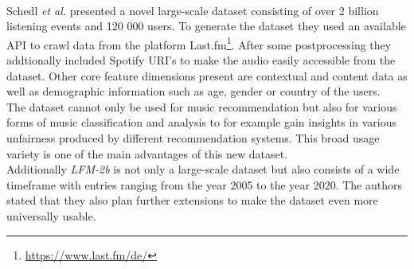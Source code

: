 \documentclass[runningheads,a4paper]{llncs}
\begin{document}
\\
Schedl \textit{et al.} presented a novel large-scale dataset consisting of over 2 billion listening events and 120 000 users.
To generate the dataset they used an available API to crawl data from the platform Last.fm\footnote{\url{https://www.last.fm/de/}}.
After some postprocessing they addtionally included Spotify URI's to make the audio easily accessible from the dataset. 
Other core feature dimensions present are contextual and content data as well as demographic information such as age, gender or country of the users.\\
The dataset cannot only be used for music recommendation but also for various forms of music classification and analysis to for example gain insights in various unfairness produced by different recommendation systems.
This broad usage variety is one of the main advantages of this new dataset.\\
Additionally \textit{LFM-2b} is not only a large-scale dataset but also consists of a wide timeframe with entries ranging from the year 2005 to the year 2020. 
The authors stated that they also plan further extensions to make the dataset even more universally usable.\cite{schedl2022lfm}
\end{document}
